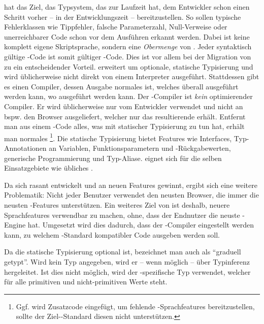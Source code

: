 \documentclass[a4paper]{scrartcl}
\begin{document}
\ts{} hat das Ziel, das Typsystem, das \js{} zur Laufzeit hat, dem Entwickler schon einen Schritt vorher -- in der Entwicklungszeit -- bereitzustellen.
So sollen typische Fehlerklassen wie Tippfehler, falsche Parameterzahl, Null-Verweise oder unerreichbarer Code schon vor dem Ausführen erkannt werden.
Dabei ist \ts{} keine komplett eigene Skriptsprache, sondern eine \textit{Obermenge} von \js{}.
Jeder syntaktisch gültige \js-Code ist somit gültiger \ts-Code.
Dies ist vor allem bei der Migration von \js{} zu \ts{} ein entscheidender Vorteil.
\ts{} erweitert \js{} um optionale, statische Typisierung und wird üblicherweise nicht direkt von einem Interpreter ausgeführt.
Stattdessen gibt es einen Compiler, dessen Ausgabe normales \js{} ist, welches überall ausgeführt werden kann, wo \js{} ausgeführt werden kann.
Der \ts-Compiler ist \textit{kein} optimierender Compiler.
Er wird üblicherweise nur vom Entwickler verwendet und nicht an bspw. den Browser ausgeliefert, welcher nur das resultierende \js{} erhält.
Entfernt man aus einem \ts-Code alles, was mit statischer Typisierung zu tun hat, erhält man normales \js{}\footnote{Ggf. wird Zusatzcode eingefügt, um fehlende \js-Sprachfeatures bereitzustellen, sollte der Ziel-\js-Standard diesen nicht unterstützen.}.
Die statische Typisierung bietet Features wie Interfaces, Typ-Annotationen an Variablen, Funktionsparametern und -Rückgabewerten, generische Programmierung und Typ-Aliase.
\ts{} eignet sich für die selben Einsatzgebiete wie übliches \js{}. %

Da sich \js{} rasant entwickelt und an neuen Features gewinnt, ergibt sich eine weitere Problematik:
Nicht jeder Benutzer verwendet den neusten Browser, die immer die neusten \js-Features unterstützen.
Ein weiteres Ziel von \ts{} ist deshalb, neuere Sprachfeatures verwendbar zu machen, ohne, dass der Endnutzer die neuste \js-Engine hat.
Umgesetzt wird dies dadurch, dass der \ts-Compiler eingestellt werden kann, zu welchem \js-Standard kompatibler Code ausgeben werden soll.

Da die statische Typisierung optional ist, bezeichnet man \ts{} auch als \enquote{graduell getypt}.
Wird kein Typ angegeben, wird er -- wenn möglich -- über Typinferenz hergeleitet.
Ist dies nicht möglich, wird der \ts-spezifische Typ \tsany{} verwendet, welcher für alle primitiven und nicht-primitiven Werte steht.
\end{document}
